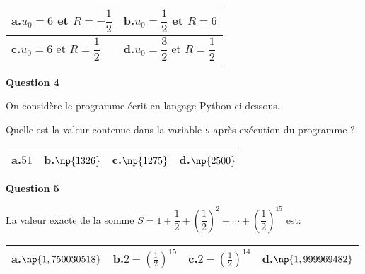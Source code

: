 \begin{center}
{\renewcommand{\arraystretch}{1}
\begin{tabularx}{0.8\linewidth}{|X|X|}
\hline
\textbf{a.}\quad $u_0=6$ et $R=-\dfrac{1}{2}$ \rule[-10pt]{0pt}{27pt}& \textbf{b.}\quad $u_0=\dfrac{1}{2}$ et $R=6$ \\
\hline
\textbf{c.}\quad $u_0=6$ et $R=\dfrac{1}{2}$  \rule[-10pt]{0pt}{27pt} & \textbf{d.}\quad $u_0=\dfrac{3}{2}$ et $R=\dfrac{1}{2}$\\
\hline
\end{tabularx}}
\end{center}

\medskip

\textbf{Question 4}

\medskip

On considère le programme écrit en langage Python ci-dessous.

\begin{center}
\end{center}

Quelle est la valeur contenue dans la variable \texttt{s} après exécution du programme ?

\begin{center}
{\renewcommand{\arraystretch}{1.5}
\begin{tabularx}{\linewidth}{|X|X|X|X|}
\hline
\textbf{a.}\quad $51$ & \textbf{b.}\quad $\np{1326}$ 
& \textbf{c.}\quad $\np{1275}$   & \textbf{d.}\quad $\np{2500}$\\
\hline
\end{tabularx}}
\end{center}

\medskip

\textbf{Question 5}

\medskip

La valeur exacte de la somme  $S= 1+ \dfrac{1}{2} + \left (\dfrac{1}{2}\right )^2 + \cdots + \left ( \dfrac{1}{2}\right )^{15}$ est:

\begin{center}
{\renewcommand{\arraystretch}{1.7}
\begin{tabularx}{\linewidth}{|X|X|X|X|}
\hline
\textbf{a.}\quad $\np{1,750030518}$ & \textbf{b.}\quad $2 - \left ( \frac{1}{2}\right )^{15}$ 
& \textbf{c.}\quad $2 - \left ( \frac{1}{2}\right )^{14}$   & \textbf{d.}\quad $\np{1,999969482}$\\
\hline
\end{tabularx}}
\end{center}


